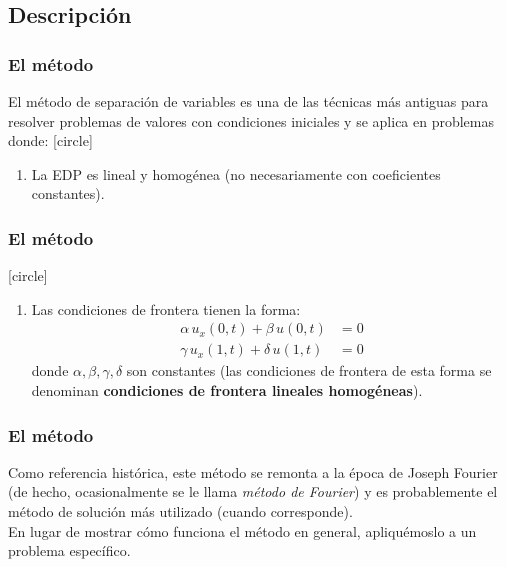 \subsection{Descripción}
\begin{frame}
\frametitle{El método}
El método de separación de variables es una de las técnicas más antiguas para resolver problemas de valores con condiciones iniciales y se aplica en problemas donde:
[circle]
\begin{enumerate}
\item La EDP es lineal y homogénea (no necesariamente con coeficientes constantes).
\seti
\end{enumerate}
\end{frame}
\begin{frame}
\frametitle{El método}
[circle]
\begin{enumerate}
\item Las condiciones de frontera tienen la forma:
\begin{align*}
\alpha \, u_{x} (0, t) + \beta \, u(0, t) &= 0 \\
\gamma \, u_{x} (1, t) + \delta \, u(1, t) &= 0
\end{align*}
donde $\alpha, \beta, \gamma, \delta$ son constantes (las condiciones de frontera de esta forma se denominan \textbf{condiciones de frontera lineales homogéneas}).
\end{enumerate}
\end{frame}
\begin{frame}
\frametitle{El método}
Como referencia histórica, este método se remonta a la época de Joseph Fourier (de hecho, ocasionalmente se le llama \emph{método de Fourier}) y es probablemente el método de solución más utilizado (cuando corresponde).
\\
\bigskip
\pause
En lugar de mostrar cómo funciona el método en general, apliquémoslo a un problema específico.
\end{frame}
